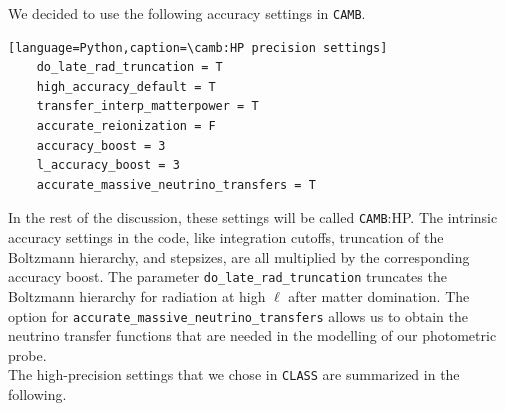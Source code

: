 \documentclass[oneside]{book}
\newcommand*{\class}{{\tt CLASS}\xspace}
\newcommand*{\camb}{{\tt CAMB}\xspace}
\begin{document}
We decided to use the following accuracy settings in \camb.  
\begin{lstlisting}[language=Python,caption=\camb:HP precision settings]
    do_late_rad_truncation = T
    high_accuracy_default = T
    transfer_interp_matterpower = T
    accurate_reionization = F
    accuracy_boost = 3
    l_accuracy_boost = 3
    accurate_massive_neutrino_transfers = T
\end{lstlisting} 
In the rest of the discussion, these settings will be called \camb:HP. The intrinsic accuracy settings in the code, like integration cutoffs, truncation of the Boltzmann hierarchy, and stepsizes, are all multiplied by the corresponding accuracy boost. The parameter {\tt do\_late\_rad\_truncation} truncates the Boltzmann hierarchy for radiation at high $\ell$ after matter domination. The option for {\tt accurate\_massive\_neutrino\_transfers} allows us to obtain the neutrino transfer functions that are needed in the modelling of our photometric probe.\\
The high-precision settings that we chose in \class are summarized in the following.
\end{document}
